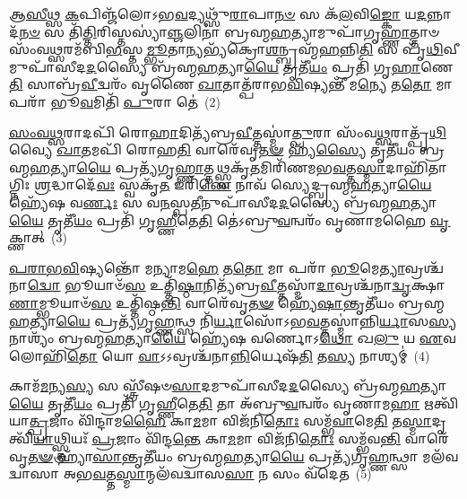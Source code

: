 𑌆\-\ul{𑌸𑍀}\-𑌥𑍍𑌸 \ul{𑌕}\-𑌪𑌿𑌞𑍍𑌜᳴𑌲𑍋\-𑌽𑌭\-\ul{𑌵}\-𑌦𑍍𑌯𑌥𑍍𑌸𑍁᳴\-\ul{𑌰𑌾}\-𑌪𑌾\-\ul{𑌨}\-\-\ul{𑍞} 𑌸 𑌕᳴\-\ul{𑌲}\-𑌵𑌿\-\ul{𑌙𑍍𑌕𑍋} 𑌯\-\ul{𑌦}\-𑌨𑍍𑌨𑌾𑌦᳴\-\ul{𑌨}\-\-\ul{𑍞} 𑌸 𑌤𑌿᳴\-\ul{𑌤𑍍𑌤𑌿}\-𑌰𑌿𑌸𑍍𑌤𑌸𑍍𑌯𑌾॑\-\ul{𑌞𑍍𑌜}\-𑌲𑌿𑌨𑌾॑ 𑌬𑍍𑌰𑌹𑍍𑌮\-\ul{𑌹}\-𑌤𑍍𑌯𑌾𑌮𑍁𑌪𑌾᳴𑌗𑍃\-\ul{𑌹𑍍𑌣𑌾}\-𑌤𑍍𑌤𑌾𑍞 𑌸𑌂᳴𑌵\-\ul{𑌥𑍍𑌸}\-𑌰𑌮᳴𑌬𑌿\-\ul{𑌭}\-𑌸𑍍𑌤\-\ul{𑌮𑍍𑌭𑍂}\-𑌤𑌾\-\ul{𑌨𑍍𑌯}\-𑌭𑍍𑌯᳴𑌕𑍍𑌰𑍋\-\ul{𑌶}\-𑌨𑍍𑌬𑍍𑌰𑌹𑍍𑌮᳴\-\ul{𑌹}\-𑌨𑍍𑌨𑌿\-\ul{𑌤𑌿} 𑌸 𑌪𑍃᳴\-\ul{𑌥𑌿}\-𑌵𑍀𑌮𑍁𑌪𑌾᳴𑌸𑍀𑌦\-\ul{𑌦}\-𑌸𑍍𑌯𑍈 𑌬𑍍𑌰᳴𑌹𑍍𑌮\-\ul{𑌹}\-𑌤𑍍𑌯𑌾\-\ul{𑌯𑍈} 𑌤𑍃𑌤𑍀᳴\-\ul{𑌯𑌂} 𑌪𑍍𑌰𑌤𑌿᳴ 𑌗𑍃\-\ul{𑌹𑌾}\-𑌣𑍇\-\ul{𑌤𑌿} 𑌸𑌾𑌬𑍍𑌰᳴\-\ul{𑌵𑍀}\-𑌦𑍍𑌵𑌰𑌂᳴ 𑌵𑍃𑌣𑍈 \ul{𑌖𑌾}\-𑌤𑌾𑌤𑍍𑌪᳴𑌰𑌾𑌭\-\ul{𑌵𑌿}\-𑌷𑍍𑌯𑌨𑍍𑌤𑍀᳴ 𑌮\-\ul{𑌨𑍍𑌯𑍇} 𑌤\-\ul{𑌤𑍋} 𑌮𑌾 𑌪𑌰𑌾᳴ 𑌭𑍂\-\ul{𑌵}\-𑌮𑌿𑌤𑌿᳴ \ul{𑌪𑍁}\-𑌰𑌾 𑌤𑍇॑~(2)

\-\ul{𑌸𑌂}\-\-\ul{𑌵}\-\-\ul{𑌥𑍍𑌸}\-𑌰𑌾𑌦𑌪𑌿᳴ 𑌰𑍋\-\ul{𑌹𑌾}\-𑌦𑌿𑌤𑍍𑌯᳴𑌬𑍍𑌰\-\ul{𑌵𑍀}\-𑌤𑍍𑌤𑌸𑍍𑌮𑌾॑\-\ul{𑌤𑍍𑌪𑍁}\-𑌰𑌾 𑌸𑌂᳴𑌵\-\ul{𑌥𑍍𑌸}\-𑌰𑌾𑌤𑍍𑌪𑍃᳴\-\ul{𑌥𑌿}\-𑌵𑍍𑌯𑍈 \ul{𑌖𑌾}\-𑌤𑌮𑌪𑌿᳴ 𑌰𑍋𑌹\-\ul{𑌤𑌿} 𑌵𑌾𑌰𑍇᳴𑌵𑍃\-\ul{𑌤}\-\-\ul{𑍟} 𑌹𑍍𑌯᳴\-\ul{𑌸𑍍𑌯𑍈} 𑌤𑍃𑌤𑍀᳴𑌯𑌂 𑌬𑍍𑌰𑌹𑍍𑌮\-\ul{𑌹}\-𑌤𑍍𑌯𑌾\-\ul{𑌯𑍈} 𑌪𑍍𑌰𑌤𑍍𑌯᳴𑌗𑍃\-\ul{𑌹𑍍𑌣𑌾}\-𑌤𑍍𑌤𑌥𑍍𑌸𑍍𑌵𑌕𑍃᳴\-\ul{𑌤}\-𑌮𑌿𑌰𑌿᳴𑌣𑌮𑌭\-\ul{𑌵}\-𑌤𑍍𑌤\-\ul{𑌸𑍍𑌮𑌾}\-𑌦𑌾𑌹𑌿᳴𑌤𑌾𑌗𑍍𑌨𑌿𑌃 \ul{𑌶𑍍𑌰}\-𑌦𑍍𑌧𑌾𑌦𑍇᳴\-\ul{𑌵𑌃} 𑌸𑍍𑌵𑌕𑍃᳴\-\ul{𑌤} 𑌇𑌰𑌿᳴\-\ul{𑌣𑍇} 𑌨𑌾𑌵᳴ 𑌸𑍍𑌯𑍇𑌦𑍍𑌬𑍍𑌰𑌹𑍍𑌮\-\ul{𑌹}\-𑌤𑍍𑌯𑌾\-\ul{𑌯𑍈} 𑌹𑍍𑌯𑍇᳴𑌷 𑌵\-\ul{𑌰𑍍𑌣𑌃} 𑌸 𑌵\-\ul{𑌨}\-𑌸𑍍𑌪\-\ul{𑌤𑍀}\-𑌨𑍁𑌪𑌾᳴𑌸𑍀𑌦\-\ul{𑌦}\-𑌸𑍍𑌯𑍈 𑌬𑍍𑌰᳴𑌹𑍍𑌮\-\ul{𑌹}\-𑌤𑍍𑌯𑌾\-\ul{𑌯𑍈} 𑌤𑍃𑌤𑍀᳴\-\ul{𑌯𑌂} 𑌪𑍍𑌰𑌤𑌿᳴ 𑌗𑍃\-\ul{𑌹𑍍𑌣𑍀}\-𑌤𑍇\-\ul{𑌤𑌿} 𑌤𑍇॑\-𑌽𑌬𑍍𑌰𑍁\-\ul{𑌵}\-𑌨𑍍𑌵𑌰𑌂᳴ 𑌵𑍃𑌣𑌾𑌮𑌹𑍈 \ul{𑌵𑍃}\-𑌕𑍍𑌣𑌾𑌤𑍍~(3)

\-\ul{𑌪}\-\-\ul{𑌰𑌾}\-\-\ul{𑌭}\-\-\ul{𑌵𑌿}\-𑌷𑍍𑌯𑌨𑍍𑌤𑍋᳴ 𑌮𑌨𑍍𑌯𑌾𑌮\-\ul{𑌹𑍇} 𑌤\-\ul{𑌤𑍋} 𑌮𑌾 𑌪𑌰𑌾᳴ \ul{𑌭𑍂}\-𑌮𑍇\-\ul{𑌤𑍍𑌯𑌾}\-𑌵𑍍𑌰𑌶𑍍𑌚᳴𑌨𑌾\-\ul{𑌦𑍍𑌵𑍋} 𑌭𑍂𑌯𑌾𑍞᳴\-\ul{𑌸} 𑌉𑌤𑍍𑌤𑌿᳴\-\ul{𑌷𑍍𑌠𑌾}\-𑌨𑌿𑌤𑍍𑌯᳴𑌬𑍍𑌰\-\ul{𑌵𑍀}\-𑌤𑍍𑌤𑌸𑍍𑌮𑌾᳴\-\ul{𑌦𑌾}\-𑌵𑍍𑌰𑌶𑍍𑌚᳴𑌨𑌾\-\ul{𑌦𑍍𑌵𑍃}\-𑌕𑍍𑌷𑌾\-\ul{𑌣𑌾}\-𑌮𑍍𑌭𑍂𑌯𑌾𑍞᳴\-\ul{𑌸} 𑌉𑌤𑍍𑌤𑌿᳴𑌷𑍍𑌠\-\ul{𑌨𑍍𑌤𑌿} 𑌵𑌾𑌰𑍇᳴𑌵𑍃\-\ul{𑌤}\-\-\ul{𑍟} 𑌹𑍍𑌯𑍇᳴\-\ul{𑌷𑌾}\-𑌨𑍍𑌤𑍃𑌤𑍀᳴𑌯𑌂 𑌬𑍍𑌰𑌹𑍍𑌮\-\ul{𑌹}\-𑌤𑍍𑌯𑌾\-\ul{𑌯𑍈} 𑌪𑍍𑌰𑌤𑍍𑌯᳴𑌗𑍃\-\ul{𑌹𑍍𑌣}\-𑌨𑍍𑌥𑍍𑌸 𑌨𑌿᳴\-\ul{𑌰𑍍𑌯𑌾}\-𑌸𑍋᳴\-𑌽𑌭\-\ul{𑌵}\-𑌤𑍍𑌤𑌸𑍍𑌮𑌾॑𑌨𑍍𑌨𑌿\-\ul{𑌰𑍍𑌯𑌾}\-𑌸\-\ul{𑌸𑍍𑌯} 𑌨𑌾𑌶𑍍𑌯𑌂᳴ 𑌬𑍍𑌰𑌹𑍍𑌮\-\ul{𑌹}\-𑌤𑍍𑌯𑌾\-\ul{𑌯𑍈} 𑌹𑍍𑌯𑍇᳴𑌷 𑌵𑌰𑍍𑌣𑍋\-𑌽\-\ul{𑌥𑍋} 𑌖\-\ul{𑌲𑍁} 𑌯 \ul{𑌏}\-𑌵 𑌲𑍋𑌹𑌿᳴\-\ul{𑌤𑍋} 𑌯𑍋 \ul{𑌵𑌾}\-\-𑌽\-𑌽𑌵𑍍𑌰𑌶𑍍𑌚᳴𑌨𑌾\-\ul{𑌨𑍍𑌨𑌿}\-𑌰𑍍𑌯𑍇𑌷᳴\-\ul{𑌤𑌿} 𑌤\-\ul{𑌸𑍍𑌯} 𑌨𑌾𑌶𑍍𑌯𑌮𑍍॑~(4)

𑌕𑌾𑌮᳴\-\ul{𑌮}\-𑌨𑍍𑌯\-\ul{𑌸𑍍𑌯} 𑌸 𑌸𑍍𑌤𑍍𑌰𑍀᳴𑌷𑍞\-\ul{𑌸𑌾}\-𑌦𑌮𑍁𑌪𑌾᳴𑌸𑍀𑌦\-\ul{𑌦}\-𑌸𑍍𑌯𑍈 𑌬𑍍𑌰᳴𑌹𑍍𑌮\-\ul{𑌹}\-𑌤𑍍𑌯𑌾\-\ul{𑌯𑍈} 𑌤𑍃𑌤𑍀᳴\-\ul{𑌯𑌂} 𑌪𑍍𑌰𑌤𑌿᳴ 𑌗𑍃\-\ul{𑌹𑍍𑌣𑍀}\-𑌤𑍇\-\ul{𑌤𑌿} 𑌤𑌾 𑌅᳴𑌬𑍍𑌰𑍁\-\ul{𑌵}\-𑌨𑍍𑌵𑌰𑌂᳴ 𑌵𑍃𑌣𑌾𑌮\-\ul{𑌹𑌾} 𑌋𑌤𑍍𑌵𑌿᳴𑌯𑌾\-\ul{𑌤𑍍𑌪𑍍𑌰}\-𑌜𑌾𑌂 𑌵𑌿᳴𑌨𑍍𑌦𑌾𑌮\-\ul{𑌹𑍈} 𑌕𑌾\-\ul{𑌮}\-𑌮𑌾 𑌵𑌿𑌜᳴𑌨𑌿\-\ul{𑌤𑍋𑌃} 𑌸𑌮𑍍𑌭᳴\-\ul{𑌵𑌾}\-𑌮𑍇\-\ul{𑌤𑌿} 𑌤\-\ul{𑌸𑍍𑌮𑌾}\-𑌦𑍃𑌤𑍍𑌵𑌿᳴\-\ul{𑌯𑌾}\-𑌥𑍍𑌸𑍍𑌤𑍍𑌰𑌿𑌯𑌃᳴ \ul{𑌪𑍍𑌰}\-𑌜𑌾𑌂 𑌵𑌿᳴𑌨𑍍𑌦\-\ul{𑌨𑍍𑌤𑍇} 𑌕𑌾\-\ul{𑌮}\-𑌮𑌾 𑌵𑌿𑌜᳴𑌨𑌿\-\ul{𑌤𑍋𑌃} 𑌸𑌮𑍍𑌭᳴𑌵\-\ul{𑌨𑍍𑌤𑌿} 𑌵𑌾𑌰𑍇᳴𑌵𑍃\-\ul{𑌤}\-\-\ul{𑍟} 𑌹𑍍𑌯𑌾᳴\-\ul{𑌸𑌾}\-𑌨𑍍𑌤𑍃𑌤𑍀᳴𑌯𑌂 𑌬𑍍𑌰𑌹𑍍𑌮\-\ul{𑌹}\-𑌤𑍍𑌯𑌾\-\ul{𑌯𑍈} 𑌪𑍍𑌰𑌤𑍍𑌯᳴𑌗𑍃\-\ul{𑌹𑍍𑌣}\-𑌨𑍍𑌥𑍍𑌸𑌾 𑌮𑌲᳴𑌵𑌦𑍍𑌵𑌾𑌸𑌾 𑌅𑌭\-\ul{𑌵}\-𑌤𑍍𑌤\-\ul{𑌸𑍍𑌮𑌾}\-𑌨𑍍𑌮𑌲᳴𑌵𑌦𑍍𑌵𑌾𑌸\-\ul{𑌸𑌾} 𑌨 𑌸𑌂 𑌵᳴𑌦𑍇𑌤~(5)

